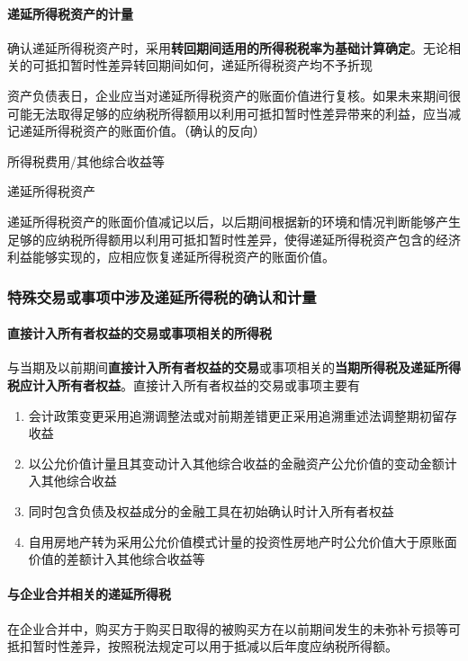 \documentclass[UTF8,12pt]{ctexart}
\newenvironment{Dr}{%
	\begin{list}{}%
		{
			\setlength{\leftmargin}{2em}
			\setlength{\labelwidth}{2em}
			\setlength{\labelsep}{0pt}
			\setlength{\itemindent}{0pt}
			\setlength{\listparindent}{0pt}
			\setlength{\parsep}{0pt}
			\setlength{\topsep}{0pt}
		}
		\item[\textbf{借：}]
	}{%
	\end{list}
}
\newenvironment{Cr}{%
	\begin{list}{}%
		{
			\setlength{\leftmargin}{3em}
			\setlength{\labelwidth}{2em}
			\setlength{\labelsep}{0pt}
			\setlength{\itemindent}{0pt}
			\setlength{\listparindent}{0pt}
			\setlength{\parsep}{0pt}
			\setlength{\topsep}{0pt}
		}
		\item[\textbf{贷：}]
	}{%
	\end{list}
}
\numberwithin{equation}{section} %
\numberwithin{figure}{section}
\numberwithin{table}{section}
\begin{document}
	\paragraph{递延所得税资产的计量}
	确认递延所得税资产时，采用\textbf{转回期间适用的所得税税率为基础计算确定}。无论相关的可抵扣暂时性差异转回期间如何，递延所得税资产均不予折现
	
	资产负债表日，企业应当对递延所得税资产的账面价值进行复核。如果未来期间很可能无法取得足够的应纳税所得额用以利用可抵扣暂时性差异带来的利益，应当减记递延所得税资产的账面价值。（确认的反向）
	\begin{Dr}
		所得税费用/其他综合收益等
	\end{Dr}
	\begin{Cr}
		递延所得税资产
	\end{Cr}
	
	递延所得税资产的账面价值减记以后，以后期间根据新的环境和情况判断能够产生足够的应纳税所得额用以利用可抵扣暂时性差异，使得递延所得税资产包含的经济利益能够实现的，应相应恢复递延所得税资产的账面价值。
	
	
	\subsubsection{特殊交易或事项中涉及递延所得税的确认和计量}
	\paragraph{直接计入所有者权益的交易或事项相关的所得税}
	与当期及以前期间\textbf{直接计入所有者权益的交易}或事项相关的\textbf{当期所得税及递延所得税应计入所有者权益}。直接计入所有者权益的交易或事项主要有
	\begin{enumerate}
		\item 会计政策变更采用追溯调整法或对前期差错更正采用追溯重述法调整期初留存收益
		
		\item 以公允价值计量且其变动计入其他综合收益的金融资产公允价值的变动金额计入其他综合收益
		
		\item 同时包含负债及权益成分的金融工具在初始确认时计入所有者权益
		
		\item 自用房地产转为采用公允价值模式计量的投资性房地产时公允价值大于原账面价值的差额计入其他综合收益等
	\end{enumerate}
	
	\paragraph{与企业合并相关的递延所得税}
	在企业合并中，购买方于购买日取得的被购买方在以前期间发生的未弥补亏损等可抵扣暂时性差异，按照税法规定可以用于抵减以后年度应纳税所得额。
	
\end{document}
